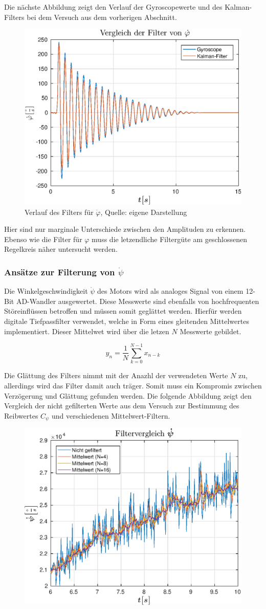 Die nächste Abbildung zeigt den Verlauf der Gyroscopewerte und des Kalman-Filters bei dem Versuch aus dem vorherigen Abschnitt.
\begin{figure}[!h]
\centering
\includegraphics[width=0.5\linewidth]{img/filtervergleich_phi__d}
\caption{Verlauf des Filters für $\dot{\varphi}$, Quelle: eigene Darstellung}
\end{figure}
Hier sind nur marginale Unterschiede zwischen den Amplituden zu erkennen. Ebenso wie die Filter für $\varphi$ muss die letzendliche Filtergüte am geschlossenen Regelkreis näher untersucht werden.

\newpage
\subsubsection{Ansätze zur Filterung von $\dot{\psi}$}
Die Winkelgeschwindigkeit $\dot{\psi}$ des Motors wird als analoges Signal von einem 12-Bit AD-Wandler ausgewertet. Diese Messwerte sind ebenfalls von hochfrequenten Störeinflüssen betroffen und müssen somit geglättet werden. Hierfür werden digitale Tiefpassfilter verwendet, welche in Form eines gleitenden Mittelwertes implementiert. Dieser Mittelwet wird über die letzen $N$ Messwerte gebildet. 

\begin{equation}
y_n = \frac{1}{N}\sum^{N-1}_{k=0} x_{n-k}
\end{equation}

Die Glättung des Filters nimmt mit der Anazhl der verwendeten Werte $N$ zu, allerdings wird das Filter damit auch träger. Somit muss ein Kompromis zwischen Verzögerung und Glättung gefunden werden. Die folgende Abbildung zeigt den Vergleich der nicht gefilterten Werte aus dem Versuch zur Bestimmung des Reibwertes $C_{\psi}$ und verschiedenen Mittelwert-Filtern. 

\begin{figure}[!h]
\centering
\includegraphics[width=0.6\linewidth]{img/filtervergleich_psi__d}
\end{figure}

